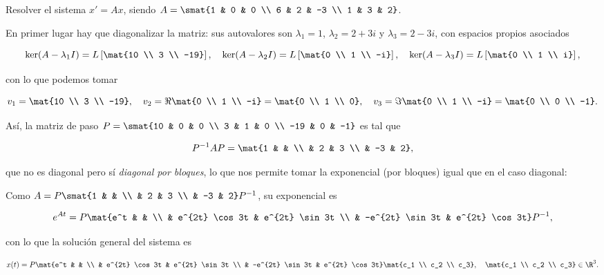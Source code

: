 \documentclass[../ecuaciones_diferenciales.tex]{subfiles}
\begin{document}
  \begin{example}
    Resolver el sistema \(x' = Ax\), siendo 
	  \(A = \smat{1 & 0 & 0 \\ 6 & 2 & -3 \\ 1 & 3 & 2}\).

    En primer lugar hay que diagonalizar la matriz: sus autovalores son
    \(\lambda_1 = 1\), \(\lambda_2 = 2+3i\) y \(\lambda_3 = 2-3i\), con espacios
    propios asociados

    \[\ker(A-\lambda_1 I) = L \left[ \mat{10 \\ 3 \\ -19} \right], \quad
      \ker(A-\lambda_2 I) = L \left[ \mat{0 \\ 1 \\ -i} \right], \quad
      \ker(A-\lambda_3 I) = L \left[\mat{0 \\ 1 \\ i} \right],\]

      con lo que podemos tomar

      \[v_1 = \mat{10 \\ 3 \\ -19}, \quad v_2 = \Re \mat{0 \\ 1 \\ -i} = \mat{0
          \\ 1 \\ 0}, \quad v_3 = \Im \mat{0 \\ 1 \\ -i} = \mat{0 \\ 0 \\ -1}.\]

      Así, la matriz de paso \(P = \smat{10 & 0 & 0 \\ 3 & 1 & 0 \\ -19 & 0 &
        -1}\) es tal que

      \[P^{-1}AP = \mat{1 & & \\ & 2 & 3 \\ & -3 & 2},\]

      que no es diagonal pero sí \emph{diagonal por bloques}, lo que nos permite
      tomar la exponencial (por bloques) igual que en el caso diagonal:

      Como \(A = P \smat{1 & & \\ & 2 & 3 \\ & -3 & 2} P^{-1}\), su exponencial es

      \[e^{At} = P \mat{e^t & & \\ & e^{2t} \cos 3t & e^{2t} \sin 3t \\ &
          -e^{2t} \sin 3t & e^{2t} \cos 3t} P^{-1},\]

      con lo que la solución general del sistema es

      \[x(t) = P \mat{e^t & & \\ & e^{2t} \cos 3t & e^{2t} \sin 3t \\ &
          -e^{2t} \sin 3t & e^{2t} \cos 3t} \mat{c_1 \\ c_2 \\ c_3}, \quad
        \mat{c_1 \\ c_2 \\ c_3} \in \R^3.\]
  \end{example}
  
\end{document}
